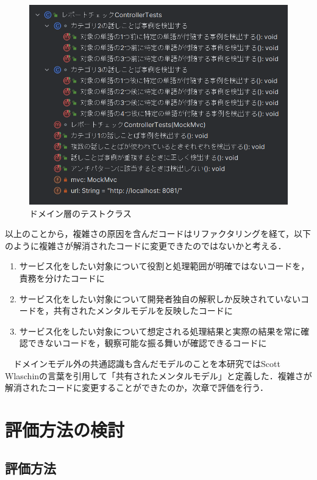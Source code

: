 \documentclass[12pt, a4paper]{jreport}
\begin{document}
\begin{figure}[H]
\centering
\includegraphics[width=1\linewidth]{image/domainTest.png}
\caption{ドメイン層のテストクラス}
\label{fig:enter-label}
\end{figure}
以上のことから，複雑さの原因を含んだコードはリファクタリングを経て，以下のように複雑さが解消されたコードに変更できたのではないかと考える．
\begin{enumerate}
\item サービス化をしたい対象について役割と処理範囲が明確ではないコードを，責務を分けたコードに
\item サービス化をしたい対象について開発者独自の解釈しか反映されていないコードを，共有されたメンタルモデルを反映したコードに
\item サービス化をしたい対象について想定される処理結果と実際の結果を常に確認できないコードを，観察可能な振る舞いが確認できるコードに
\end{enumerate}
　ドメインモデル外の共通認識も含んだモデルのことを本研究ではScott Wlaschin\cite{mental}の言葉を引用して「共有されたメンタルモデル」と定義した．複雑さが解消されたコードに変更することができたのか，次章で評価を行う．
\chapter{評価方法の検討}
\section{評価方法}
\end{document}
